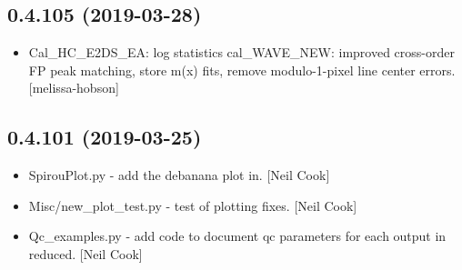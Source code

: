 \documentclass[a4paper,10pt,english]{report}
\begin{document}
\subsection{0.4.105 (2019-03-28)}
\label{\detokenize{misc/changelog:id156}}\begin{itemize}
\item {} 
Cal\_HC\_E2DS\_EA: log statistics cal\_WAVE\_NEW: improved cross-order FP
peak matching, store m(x) fits, remove modulo-1-pixel line center
errors. {[}melissa-hobson{]}

\end{itemize}


\subsection{0.4.101 (2019-03-25)}
\label{\detokenize{misc/changelog:id157}}\begin{itemize}
\item {} 
SpirouPlot.py - add the debanana plot in. {[}Neil Cook{]}

\item {} 
Misc/new\_plot\_test.py - test of plotting fixes. {[}Neil Cook{]}

\item {} 
Qc\_examples.py - add code to document qc parameters for each output in
reduced. {[}Neil Cook{]}

\end{itemize}
\end{document}
